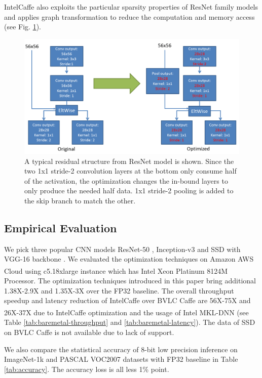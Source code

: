 IntelCaffe also exploits the particular sparsity properties of ResNet family models and applies graph transformation to reduce the computation and memory access (see Fig. \ref{fig:sparse_resnet}).

\begin{figure}
  \includegraphics[width=\linewidth]{figures/sparse_resnet.png}
  \caption{A typical residual structure from ResNet model is shown. Since the two 1x1 stride-2 convolution layers at the bottom only consume half of the activation, the optimization changes the in-bound layers to only produce the needed half data. 1x1 stride-2 pooling is added to the skip branch to match the other.}
  \label{fig:sparse_resnet}
\end{figure}

\subsection{Empirical Evaluation}
We pick three popular CNN models ResNet-50 \cite{DBLP:journals/corr/HeZRS15}, Inception-v3 \cite{DBLP:journals/corr/SzegedyVISW15} and SSD with VGG-16 backbone \cite{DBLP:journals/corr/LiuAESR15}. We evaluated the optimization techniques on Amazon AWS Cloud using c5.18xlarge instance which has Intel\textsuperscript{\textregistered} Xeon\textsuperscript{\textregistered} Platinum 8124M Processor. The optimization techniques introduced in this paper bring additional 1.38X-2.9X and 1.35X-3X over the FP32 baseline. The overall throughput speedup and latency reduction of IntelCaffe over BVLC Caffe are 56X-75X and 26X-37X due to IntelCaffe optimization and the usage of Intel\textsuperscript{\textregistered} MKL-DNN (see Table \ref{tab:baremetal-throughput} and \ref{tab:baremetal-latency}). The data of SSD on BVLC Caffe is not available due to lack of support.

We also compare the statistical accuracy of 8-bit low precision inference on ImageNet-1k \cite{ILSVRC15} and PASCAL VOC2007 \cite{Everingham15} datasets with FP32 baseline in Table \ref{tab:accuracy}. The accuracy loss is all less 1\% point.


